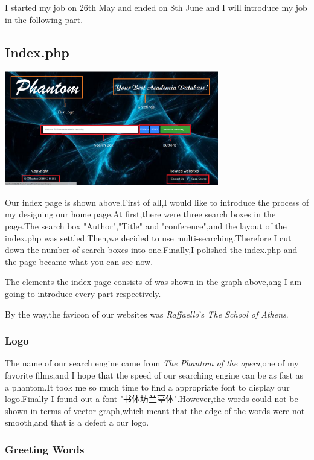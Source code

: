 \documentclass[10pt,twoside,a4paper,titlepage]{article}
\begin{document}
	I started my job on 26th May and ended on 8th June and I will introduce my job in the following part.
	
	
	\subsection{Index.php}
	
	\includegraphics[width=0.7\textwidth]{cyf/index_structure.PNG}
	
	Our index page is shown above.First of all,I would like to introduce the process of my designing our home page.At first,there were three search boxes in the page.The search box "Author","Title" and "conference",and the layout of the index.php was settled.Then,we decided to use multi-searching.Therefore I cut down the number of search boxes into one.Finally,I polished the index.php and the page became what you can see now.
	
	The elements the index page consists of was shown in the graph above,ang I am going to introduce every part respectively.
	
	By the way,the favicon of our websites was \emph{Raffaello}'s \emph{The School of Athens}.
	
	\subsubsection{Logo}
	
	The name of our search engine came from \emph{The Phantom of the opera},one of my favorite films,and I hope that the speed of our searching engine can be as fast as a phantom.It took me so much time to find a appropriate font to display our logo.Finally I found out a font "书体坊兰亭体".However,the words could not be shown in terms of vector graph,which meant that the edge of the words were not smooth,and that is a defect a our logo.
	
	\subsubsection{Greeting Words}
	
\end{document}
